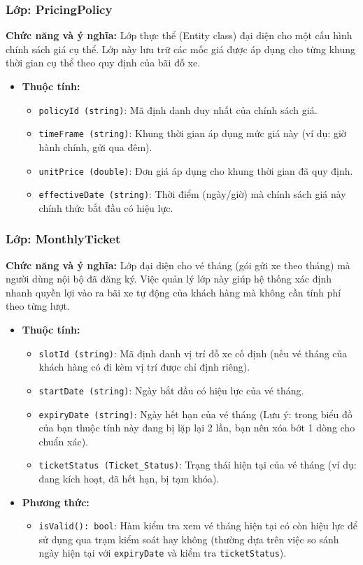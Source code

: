\subsubsection{Lớp: PricingPolicy}
\textbf{Chức năng và ý nghĩa:} Lớp thực thể (Entity class) đại diện cho một cấu hình chính sách giá cụ thể. Lớp này lưu trữ các mốc giá được áp dụng cho từng khung thời gian cụ thể theo quy định của bãi đỗ xe.
\begin{itemize}
    \item \textbf{Thuộc tính:}
    \begin{itemize}
        \item \texttt{policyId (string)}: Mã định danh duy nhất của chính sách giá.
        \item \texttt{timeFrame (string)}: Khung thời gian áp dụng mức giá này (ví dụ: giờ hành chính, gửi qua đêm).
        \item \texttt{unitPrice (double)}: Đơn giá áp dụng cho khung thời gian đã quy định.
        \item \texttt{effectiveDate (string)}: Thời điểm (ngày/giờ) mà chính sách giá này chính thức bắt đầu có hiệu lực.
    \end{itemize}
\end{itemize}

\subsubsection{Lớp: MonthlyTicket}
\textbf{Chức năng và ý nghĩa:} Lớp đại diện cho vé tháng (gói gửi xe theo tháng) mà người dùng nội bộ đã đăng ký. Việc quản lý lớp này giúp hệ thống xác định nhanh quyền lợi vào ra bãi xe tự động của khách hàng mà không cần tính phí theo từng lượt.
\begin{itemize}
    \item \textbf{Thuộc tính:}
    \begin{itemize}
        \item \texttt{slotId (string)}: Mã định danh vị trí đỗ xe cố định (nếu vé tháng của khách hàng có đi kèm vị trí được chỉ định riêng).
        \item \texttt{startDate (string)}: Ngày bắt đầu có hiệu lực của vé tháng.
        \item \texttt{expiryDate (string)}: Ngày hết hạn của vé tháng (Lưu ý: trong biểu đồ của bạn thuộc tính này đang bị lặp lại 2 lần, bạn nên xóa bớt 1 dòng cho chuẩn xác).
        \item \texttt{ticketStatus (Ticket\_Status)}: Trạng thái hiện tại của vé tháng (ví dụ: đang kích hoạt, đã hết hạn, bị tạm khóa).
    \end{itemize}
    \item \textbf{Phương thức:}
    \begin{itemize}
        \item \texttt{isValid(): bool}: Hàm kiểm tra xem vé tháng hiện tại có còn hiệu lực để sử dụng qua trạm kiểm soát hay không (thường dựa trên việc so sánh ngày hiện tại với \texttt{expiryDate} và kiểm tra \texttt{ticketStatus}).
    \end{itemize}
\end{itemize}
